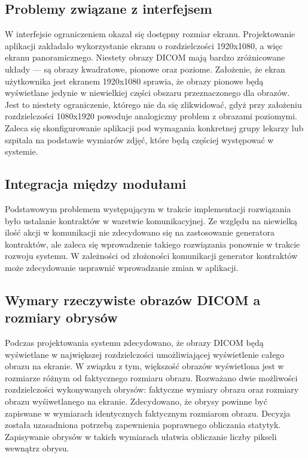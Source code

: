 \documentclass[a4paper,11pt,twoside]{report}
\theoremstyle{definition}
\begin{document}
\subsection {Problemy związane z interfejsem}

W interfejsie ograniczeniem okazał się dostępny rozmiar ekranu. Projektowanie aplikacji zakładało wykorzystanie ekranu o rozdzielczości 1920x1080, a więc ekranu panoramicznego. Niestety obrazy DICOM mają bardzo zróżnicowane układy --- są obrazy kwadratowe, pionowe oraz poziome. Założenie, że ekran użytkownika jest ekranem 1920x1080 sprawia, że obrazy pionowe będą wyświetlane jedynie w niewielkiej części obszaru przeznaczonego dla obrazów. Jest to niestety ograniczenie, którego nie da się zlikwidować, gdyż przy założeniu rozdzielczości 1080x1920 powoduje analogiczny problem z obrazami poziomymi. Zaleca się skonfigurowanie aplikacji pod wymagania konkretnej grupy lekarzy lub szpitala na podstawie wymiarów zdjęć, które będą częściej występować w systemie.

\subsection {Integracja między modułami}

Podstawowym problemem występującym w trakcie implementacji rozwiązania było ustalanie kontraktów w warstwie komunikacyjnej. Ze względu na niewielką ilość akcji w komunikacji nie zdecydowano się na zastosowanie generatora kontraktów, ale zaleca się wprowadzenie takiego rozwiązania ponownie w trakcie rozwoju systemu. W zależności od złożoności komunikacji generator kontraktów może zdecydowanie usprawnić wprowadzanie zmian w aplikacji. 

\subsection {Wymary rzeczywiste obrazów DICOM a rozmiary obrysów}

Podczas projektowania systemu zdecydowano, że obrazy DICOM będą wyświetlane w największej rozdzielczości umożliwiającej wyświetlenie całego obrazu na ekranie. W związku z tym, większość obrazów wyświetlona jest w rozmiarze różnym od faktycznego rozmiaru obrazu. Rozważano dwie możliwości rozdzielczości wykonywanych obrysów: faktyczne wymiary obrazu oraz rozmiary obrazu wyśiwetlanego na ekranie. Zdecydowano, że obrysy powinne być zapiswane w wymiarach identycznych faktycznym rozmiarom obrazu. Decyzja została uzasadniona potrzebą zapewnienia poprawnego obliczania statytyk. Zapisywanie obrysów w takich wymiarach ułatwia obliczanie liczby pikseli wewnątrz obrysu.
\end{document}
